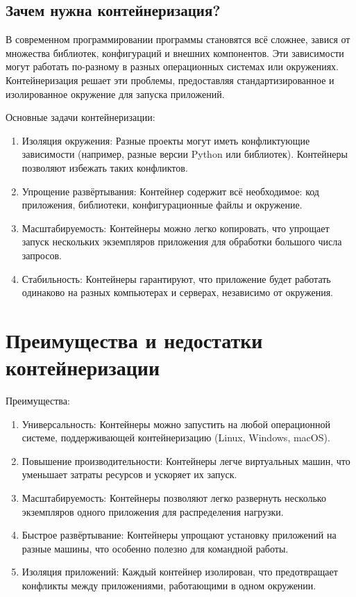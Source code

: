 \subsection*{Зачем нужна контейнеризация?}
В современном программировании программы становятся всё сложнее, завися от множества библиотек, конфигураций и внешних компонентов. Эти зависимости могут работать по-разному в разных операционных системах или окружениях. Контейнеризация решает эти проблемы, предоставляя стандартизированное и изолированное окружение для запуска приложений.

Основные задачи контейнеризации:
\begin{enumerate}
    \item Изоляция окружения: Разные проекты могут иметь конфликтующие зависимости (например, разные версии Python или библиотек). Контейнеры позволяют избежать таких конфликтов.
    \item Упрощение развёртывания: Контейнер содержит всё необходимое: код приложения, библиотеки, конфигурационные файлы и окружение.
    \item Масштабируемость: Контейнеры можно легко копировать, что упрощает запуск нескольких экземпляров приложения для обработки большого числа запросов.
    \item Стабильность: Контейнеры гарантируют, что приложение будет работать одинаково на разных компьютерах и серверах, независимо от окружения.
\end{enumerate}

\section{Преимущества и недостатки контейнеризации}
Преимущества:
\begin{enumerate}
    \item Универсальность: Контейнеры можно запустить на любой операционной системе, поддерживающей контейнеризацию (Linux, Windows, macOS).
    \item Повышение производительности: Контейнеры легче виртуальных машин, что уменьшает затраты ресурсов и ускоряет их запуск.
    \item Масштабируемость: Контейнеры позволяют легко развернуть несколько экземпляров одного приложения для распределения нагрузки.
    \item Быстрое развёртывание: Контейнеры упрощают установку приложений на разные машины, что особенно полезно для командной работы.
    \item Изоляция приложений: Каждый контейнер изолирован, что предотвращает конфликты между приложениями, работающими в одном окружении.
\end{enumerate}


